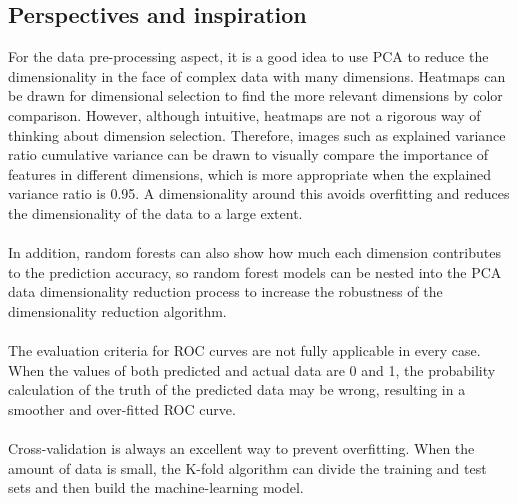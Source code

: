 \documentclass[10pt,twocolumn]{article}
\begin{document}
	\subsection{Perspectives and inspiration}
	For the data pre-processing aspect, it is a good idea to use PCA to reduce the dimensionality in the face of complex data with many dimensions. Heatmaps can be drawn for dimensional selection to find the more relevant dimensions by color comparison. However, although intuitive, heatmaps are not a rigorous way of thinking about dimension selection. Therefore, images such as explained variance ratio cumulative variance can be drawn to visually compare the importance of features in different dimensions, which is more appropriate when the explained variance ratio is 0.95. A dimensionality around this avoids overfitting and reduces the dimensionality of the data to a large extent. 
	\\ \hspace*{\fill} \\
	In addition, random forests can also show how much each dimension contributes to the prediction accuracy, so random forest models can be nested into the PCA data dimensionality reduction process to increase the robustness of the dimensionality reduction algorithm.
	\\ \hspace*{\fill} \\
	The evaluation criteria for ROC curves are not fully applicable in every case. When the values of both predicted and actual data are 0 and 1, the probability calculation of the truth of the predicted data may be wrong, resulting in a smoother and over-fitted ROC curve.
	\\ \hspace*{\fill} \\
	Cross-validation is always an excellent way to prevent overfitting. When the amount of data is small, the K-fold algorithm can divide the training and test sets and then build the machine-learning model.
	\\ \hspace*{\fill} \\
\end{document}
